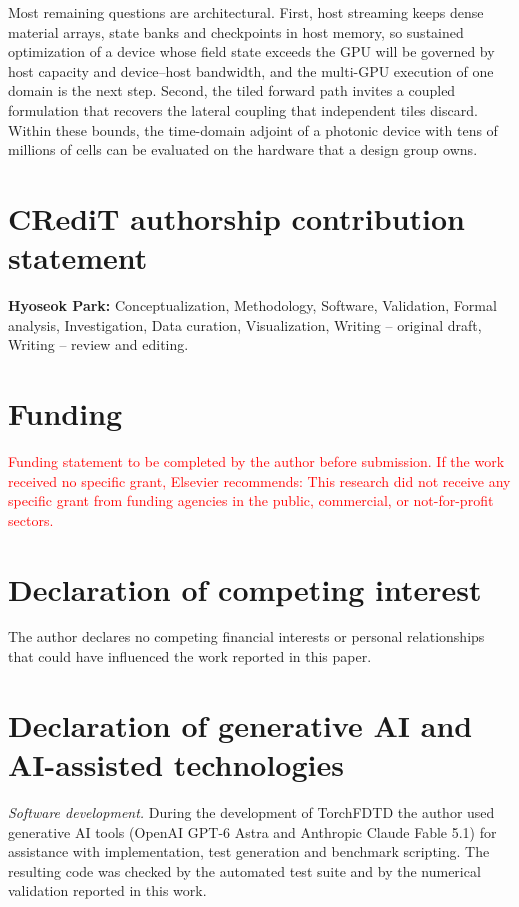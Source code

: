 \documentclass[preprint,11pt]{elsarticle}
\newcommand{\authorcheck}[1]{\textcolor{red}{#1}}
\begin{document}
Most remaining questions are architectural. First, host streaming keeps dense material arrays, state banks and checkpoints in host memory, so sustained optimization of a device whose field state exceeds the GPU will be governed by host capacity and device--host bandwidth, and the multi-GPU execution of one domain is the next step. Second, the tiled forward path invites a coupled formulation that recovers the lateral coupling that independent tiles discard. Within these bounds, the time-domain adjoint of a photonic device with tens of millions of cells can be evaluated on the hardware that a design group owns.

\section*{CRediT authorship contribution statement}

\textbf{Hyoseok Park:} Conceptualization, Methodology, Software, Validation, Formal analysis, Investigation, Data curation, Visualization, Writing -- original draft, Writing -- review and editing.

\section*{Funding}

\authorcheck{Funding statement to be completed by the author before submission. If the work received no specific grant, Elsevier recommends: This research did not receive any specific grant from funding agencies in the public, commercial, or not-for-profit sectors.}

\section*{Declaration of competing interest}

The author declares no competing financial interests or personal relationships that could have influenced the work reported in this paper.

\section*{Declaration of generative AI and AI-assisted technologies}

\textit{Software development.} During the development of TorchFDTD the author used generative AI tools (OpenAI GPT-6 Astra and Anthropic Claude Fable 5.1) for assistance with implementation, test generation and benchmark scripting. The resulting code was checked by the automated test suite and by the numerical validation reported in this work.
\end{document}
